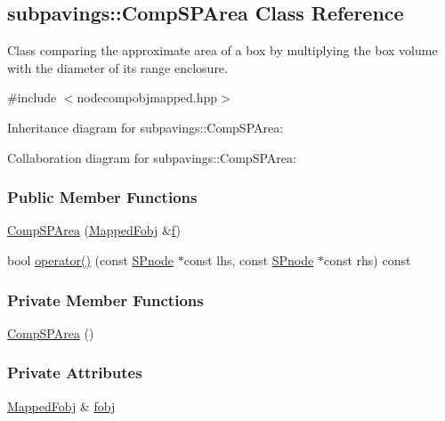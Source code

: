 \hypertarget{classsubpavings_1_1CompSPArea}{\subsection{subpavings\-:\-:\-Comp\-S\-P\-Area \-Class \-Reference}
\label{classsubpavings_1_1CompSPArea}
}


\-Class comparing the approximate area of a box by multiplying the box volume with the diameter of its range enclosure.  




{\ttfamily \#include $<$nodecompobjmapped.\-hpp$>$}



\-Inheritance diagram for subpavings\-:\-:\-Comp\-S\-P\-Area\-:


\-Collaboration diagram for subpavings\-:\-:\-Comp\-S\-P\-Area\-:
\subsubsection*{\-Public \-Member \-Functions}
\begin{DoxyCompactItemize}
\item 
\hyperlink{classsubpavings_1_1CompSPArea_a4fdad40a42f54ba4f8b1aac0e504ca4e}{\-Comp\-S\-P\-Area} (\hyperlink{classsubpavings_1_1MappedFobj}{\-Mapped\-Fobj} \&\hyperlink{errorfunc_8hpp_aacb77b1211a6ca2e2beff1811cf9ecf4}{f})
\item 
bool \hyperlink{classsubpavings_1_1CompSPArea_a0cdc7c4e83e51d70017b74e37072f0e8}{operator()} (const \hyperlink{classsubpavings_1_1SPnode}{\-S\-Pnode} $\ast$const lhs, const \hyperlink{classsubpavings_1_1SPnode}{\-S\-Pnode} $\ast$const rhs) const 
\end{DoxyCompactItemize}
\subsubsection*{\-Private \-Member \-Functions}
\begin{DoxyCompactItemize}
\item 
\hyperlink{classsubpavings_1_1CompSPArea_a224a27cbb677b8952cd93a73a39fd1a0}{\-Comp\-S\-P\-Area} ()
\end{DoxyCompactItemize}
\subsubsection*{\-Private \-Attributes}
\begin{DoxyCompactItemize}
\item 
\hyperlink{classsubpavings_1_1MappedFobj}{\-Mapped\-Fobj} \& \hyperlink{classsubpavings_1_1CompSPArea_aff332dcd6dc387f8f0a8f290c2bad73e}{fobj}
\end{DoxyCompactItemize}


